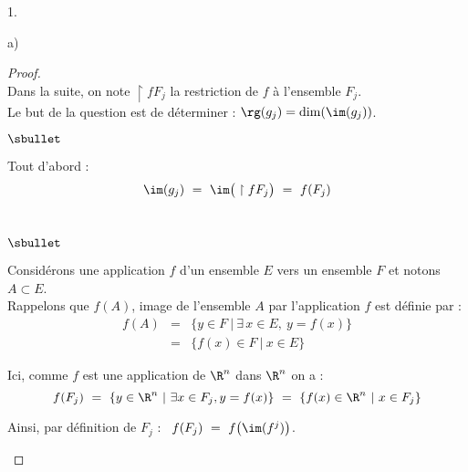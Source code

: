 \documentclass[11pt]{article}%
\begin{document}
\begin{noliste}{1.}
\begin{noliste}{a)}
    \begin{proof}~\\%
      Dans la suite, on note $\restriction{f}{F_j}$ la restriction de
      $f$ à l'ensemble $F_j$.\\
      Le but de la question est de déterminer : $\rg(g_j) = \dim(\im(g_j))$.
      \begin{noliste}{$\sbullet$}
      \item Tout d'abord :
        \[
        \im(g_j) \ = \ \im\big( \restriction{f}{F_j} \big) \ = \
        f(F_j)
        \]~\\[-1cm]
        \begin{remarkL}{.98}%
          \begin{noliste}{$\sbullet$}
          \item Considérons une application $f$ d'un ensemble $E$ vers
            un ensemble $F$ et notons $A \subset E$.\\
            Rappelons que $f(A)$, image de l'ensemble $A$ par
            l'application $f$ est définie par :
            \[
            \begin{array}{rcl}
              f(A) & = & \{ y \in F \ | \ \exists \, x \in E, \ y = 
	      f(x) \}
              \\[.2cm]
              & = & \{ f(x) \in F \ | \ x \in E \}
            \end{array}
            \]
          \item Ici, comme $f$ est une application de $\R^n$ dans
            $\R^n$ on a :
            \[
            f(F_j) \ = \ \{ y \in \R^n \ | \ \exists x \in F_j, y =
            f(x) \} \ = \ \{ f(x) \in \R^n \ | \ x \in F_j \}
            \]
          \end{noliste}
        \end{remarkL}

      \item Ainsi, par définition de $F_j$ : \ $f(F_j) \ = \ f\big(
        \im(f^j) \big)$.        


\end{noliste}
\end{proof}
\end{noliste}
\end{noliste}
\end{document}
